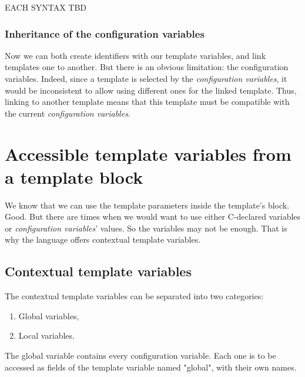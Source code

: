 \documentclass[american]{rtxreport}
\begin{document}
EACH SYNTAX TBD



\subsection{Inheritance of the configuration variables}

Now we can both create identifiers with our template variables, and link
templates one to another. But there is an obvious limitation: the configuration
variables. Indeed, since a template is selected by the \emph{configuration
variables}, it would be inconsistent to allow using different ones for the
linked template. Thus, linking to another template means that this template
must be compatible with the current \emph{configuration variables}.


\chapter{Accessible template variables from a template block}

We know that we can use the template parameters inside the template's block.
Good. But there are times when we would want to use either C-declared variables
or \emph{configuration variables}' values. So the variables may not be enough.
That is why the language offers contextual template variables.

\section{Contextual template variables}

The contextual template variables can be separated into two categories:
\begin{enumerate}
    \item Global variables,
    \item Local variables.
\end{enumerate}

The global variable contains every configuration variable. Each one is to be
accessed as fields of the template variable named "global", with their own
names.
\end{document}
